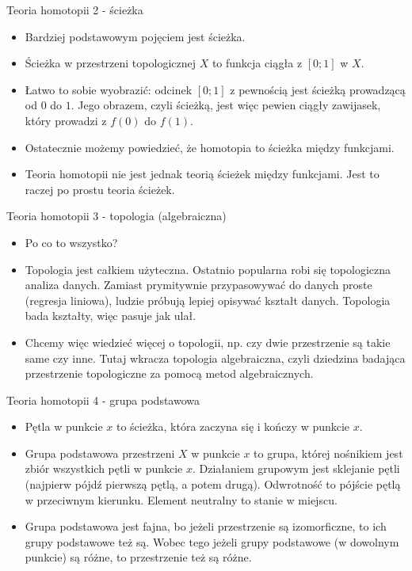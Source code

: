 \documentclass{beamer}
\begin{document}
\begin{frame}{Teoria homotopii 2 - ścieżka}
\begin{itemize}
	\item Bardziej podstawowym pojęciem jest ścieżka.
	\item Ścieżka w przestrzeni topologicznej $X$ to funkcja ciągła z $[0; 1]$ w $X$.
	\item Łatwo to sobie wyobrazić: odcinek $[0; 1]$ z pewnością jest ścieżką prowadzącą od $0$ do $1$. Jego obrazem, czyli ścieżką, jest więc pewien ciągły zawijasek, który prowadzi z $f(0)$ do $f(1)$.
	\item Ostatecznie możemy powiedzieć, że homotopia to ścieżka między funkcjami.
	\item Teoria homotopii nie jest jednak teorią ścieżek między funkcjami. Jest to raczej po prostu teoria ścieżek.
\end{itemize}
\end{frame}

\begin{frame}{Teoria homotopii 3 - topologia (algebraiczna)}
\begin{itemize}
	\item Po co to wszystko?
	\item Topologia jest całkiem użyteczna. Ostatnio popularna robi się topologiczna analiza danych. Zamiast prymitywnie przypasowywać do danych proste (regresja liniowa), ludzie próbują lepiej opisywać kształt danych. Topologia bada kształty, więc pasuje jak ulał.
	\item Chcemy więc wiedzieć więcej o topologii, np. czy dwie przestrzenie są takie same czy inne. Tutaj wkracza topologia algebraiczna, czyli dziedzina badająca przestrzenie topologiczne za pomocą metod algebraicznych.
\end{itemize}
\end{frame}

\begin{frame}{Teoria homotopii 4 - grupa podstawowa}
\begin{itemize}
	\item Pętla w punkcie $x$ to ścieżka, która zaczyna się i kończy w punkcie $x$.
	\item Grupa podstawowa przestrzeni $X$ w punkcie $x$ to grupa, której nośnikiem jest zbiór wszystkich pętli w punkcie $x$. Działaniem grupowym jest sklejanie pętli (najpierw pójdź pierwszą pętlą, a potem drugą). Odwrotność to pójście pętlą w przeciwnym kierunku. Element neutralny to stanie w miejscu.
	\item Grupa podstawowa jest fajna, bo jeżeli przestrzenie są izomorficzne, to ich grupy podstawowe też są. Wobec tego jeżeli grupy podstawowe (w dowolnym punkcie) są różne, to przestrzenie też są różne.
\end{itemize}
\end{frame}
\end{document}
